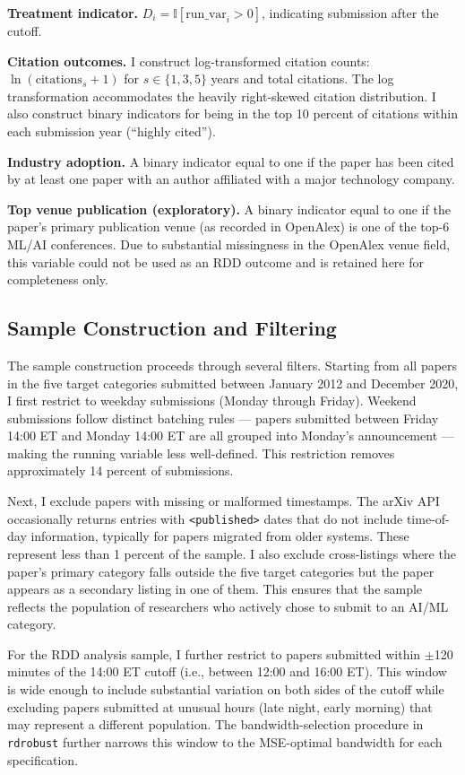 \documentclass[12pt]{article}
\newcommand{\ind}{\mathbb{I}}
\begin{document}
\textbf{Treatment indicator.} $D_i = \ind[\text{run\_var}_i > 0]$, indicating submission after the cutoff.

\textbf{Citation outcomes.} I construct log-transformed citation counts: $\ln(\text{citations}_{s} + 1)$ for $s \in \{1, 3, 5\}$ years and total citations. The log transformation accommodates the heavily right-skewed citation distribution. I also construct binary indicators for being in the top 10 percent of citations within each submission year (``highly cited'').

\textbf{Industry adoption.} A binary indicator equal to one if the paper has been cited by at least one paper with an author affiliated with a major technology company.

\textbf{Top venue publication (exploratory).} A binary indicator equal to one if the paper's primary publication venue (as recorded in OpenAlex) is one of the top-6 ML/AI conferences. Due to substantial missingness in the OpenAlex venue field, this variable could not be used as an RDD outcome and is retained here for completeness only.

\subsection{Sample Construction and Filtering}

The sample construction proceeds through several filters. Starting from all papers in the five target categories submitted between January 2012 and December 2020, I first restrict to weekday submissions (Monday through Friday). Weekend submissions follow distinct batching rules --- papers submitted between Friday 14:00 ET and Monday 14:00 ET are all grouped into Monday's announcement --- making the running variable less well-defined. This restriction removes approximately 14 percent of submissions.

Next, I exclude papers with missing or malformed timestamps. The arXiv API occasionally returns entries with \texttt{<published>} dates that do not include time-of-day information, typically for papers migrated from older systems. These represent less than 1 percent of the sample. I also exclude cross-listings where the paper's primary category falls outside the five target categories but the paper appears as a secondary listing in one of them. This ensures that the sample reflects the population of researchers who actively chose to submit to an AI/ML category.

For the RDD analysis sample, I further restrict to papers submitted within $\pm$120 minutes of the 14:00 ET cutoff (i.e., between 12:00 and 16:00 ET). This window is wide enough to include substantial variation on both sides of the cutoff while excluding papers submitted at unusual hours (late night, early morning) that may represent a different population. The bandwidth-selection procedure in \texttt{rdrobust} further narrows this window to the MSE-optimal bandwidth for each specification.
\end{document}
